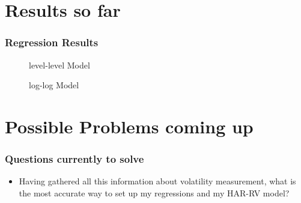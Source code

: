 \documentclass[aspectratio=169]{beamer}
\begin{document}
\section{Results so far}

\begin{frame}
\frametitle{Regression Results}
\begin{scriptsize}
\begin{minipage}{0.45\textwidth}
	\begin{figure}[!htbp]
	\caption{level-level Model}
	\centering
	
	\end{figure}
\end{minipage}
%
\begin{minipage}{0.45\textwidth}
	\begin{figure}[!htbp]
	\caption{log-log Model}
	\centering
	
	\end{figure}
\end{minipage}
\end{scriptsize}
\end{frame}


\section{Possible Problems coming up}

\begin{frame}
\frametitle{Questions currently to solve}
	\begin{itemize}
	\item Having gathered all this information about volatility measurement, what is the most accurate way to set up my regressions and my HAR-RV model?
	
	\end{itemize}
\end{frame}


\begin{frame}
\printbibliography
\end{frame}
\end{document}
